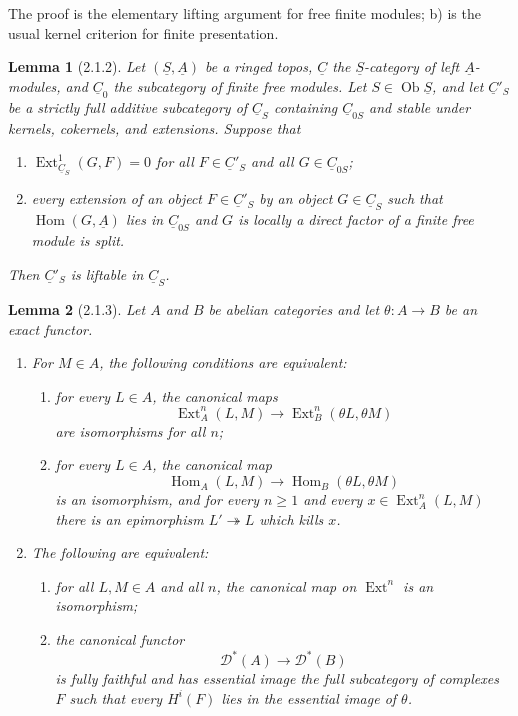\documentclass[11pt]{article}
\theoremstyle{plain}
\newtheorem*{lemma*}{Lemma}
\theoremstyle{definition}
\theoremstyle{remark}
\newcommand{\D}{\mathcal D}\newcommand{\E}{\mathcal E}\newcommand{\F}{\mathcal F}
\DeclareMathOperator{\Hom}{Hom}
\DeclareMathOperator{\Ext}{Ext}
\DeclareMathOperator{\ob}{Ob}
\newcommand{\uA}{\underline{A}}\newcommand{\uH}{\underline{H}}\newcommand{\uExt}{\underline{\operatorname{Ext}}}\newcommand{\uL}{\underline{L}}\newcommand{\uM}{\underline{M}}\newcommand{\uZ}{\underline{Z}}\newcommand{\uB}{\underline{B}}\newcommand{\uC}{\underline{C}}\newcommand{\uD}{\underline{D}}\newcommand{\uE}{\underline{E}}\newcommand{\uG}{\underline{G}}\newcommand{\uP}{\underline{P}}\newcommand{\uQ}{\underline{Q}}
\providecommand{\uS}{\underline{S}}
\begin{document}
The proof is the elementary lifting argument for free finite modules; b) is the usual kernel criterion for finite presentation.

\begin{lemma*}[2.1.2]
Let $(\uS,\uA)$ be a ringed topos, $\uC$ the $\uS$-category of left $\uA$-modules, and $\uC_0$ the subcategory of finite free modules. Let $S\in\ob\uS$, and let $\uC'_S$ be a strictly full additive subcategory of $\uC_S$ containing $\uC_{0S}$ and stable under kernels, cokernels, and extensions. Suppose that
\begin{enumerate}[label=(\roman*)]
\item $\Ext^1_{\uC_S}(G,F)=0$ for all $F\in\uC'_S$ and all $G\in\uC_{0S}$;
\item every extension of an object $F\in\uC'_S$ by an object $G\in\uC_S$ such that $\Hom(G,\uA)$ lies in $\uC_{0S}$ and $G$ is locally a direct factor of a finite free module is split.
\end{enumerate}
Then $\uC'_S$ is liftable in $\uC_S$.
\end{lemma*}

\begin{lemma*}[2.1.3]
Let $A$ and $B$ be abelian categories and let $\theta:A\to B$ be an exact functor.
\begin{enumerate}[label=\alph*)]
\item For $M\in A$, the following conditions are equivalent:
\begin{enumerate}[label=(\roman*)]
\item for every $L\in A$, the canonical maps
\[
\Ext_A^n(L,M)\longrightarrow \Ext_B^n(\theta L,\theta M)
\]
are isomorphisms for all $n$;
\item for every $L\in A$, the canonical map
\[
\Hom_A(L,M)\longrightarrow \Hom_B(\theta L,\theta M)
\]
is an isomorphism, and for every $n\ge1$ and every $x\in\Ext_A^n(L,M)$ there is an epimorphism $L'\twoheadrightarrow L$ which kills $x$.
\end{enumerate}
\item The following are equivalent:
\begin{enumerate}[label=(\roman*)]
\item for all $L,M\in A$ and all $n$, the canonical map on $\Ext^n$ is an isomorphism;
\item the canonical functor
\[
\D^*(A)\longrightarrow \D^*(B)
\]
is fully faithful and has essential image the full subcategory of complexes $F$ such that every $H^i(F)$ lies in the essential image of $\theta$.
\end{enumerate}
\end{enumerate}
\end{lemma*}
\end{document}
